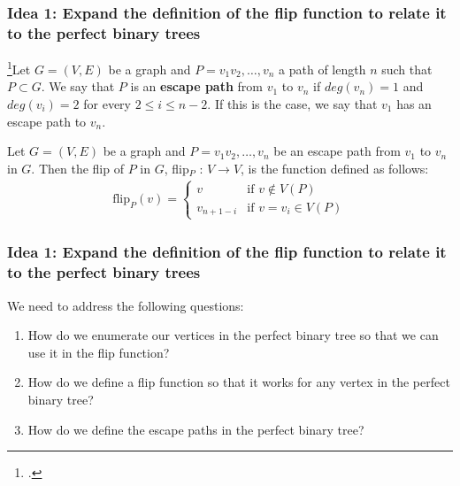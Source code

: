 \documentclass[10pt,]{beamer}
\theoremstyle{conjectureStyle}
\theoremstyle{notationStyle}
\theoremstyle{claimStyle}
\begin{document}
\begin{frame}\frametitle{Idea 1: Expand the definition of the flip function to relate it to the perfect binary trees}
    \begin{definition}
        \footcite{MR2763040}Let $G = (V, E)$ be a graph and $P = v_1v_2, \ldots , v_n$ a path of length $n$ such that $P \subset G$. We say that $P$ is an \textbf{escape path} from $v_1$ to $v_n$ if $deg(v_n) = 1$ and $deg(v_i) = 2$ for every $2 \leq i \leq n - 2$. If this is the case, we say that $v_1$ has an escape path to $v_n$.
    \end{definition}
    \pause

    \begin{definition}
        Let $G = (V, E)$ be a graph and $P = v_1v_2, \ldots, v_n$ be an escape path from $v_1$ to $v_n$ in $G$. Then the flip of $P$ in $G$, flip$_P$ : $V \rightarrow V$, is the function defined as follows:
        \begin{align*}
            \text{flip}_P(v) = \begin{cases}
                                   v             & \text{if } v \not\in V(P)   \\
                                   v_{n + 1 - i} & \text{if } v = v_i \in V(P)
                               \end{cases}
        \end{align*}
    \end{definition}
\end{frame}

\begin{frame}\frametitle{Idea 1: Expand the definition of the flip function to relate it to the perfect binary trees}
    We need to address the following questions:
    \begin{enumerate}[<+->]
        \item How do we enumerate our vertices in the perfect binary tree so that we can use it in the flip function?
        \item How do we define a flip function so that it works for any vertex in the perfect binary tree?
        \item How do we define the escape paths in the perfect binary tree?
    \end{enumerate}
\end{frame}
\end{document}
